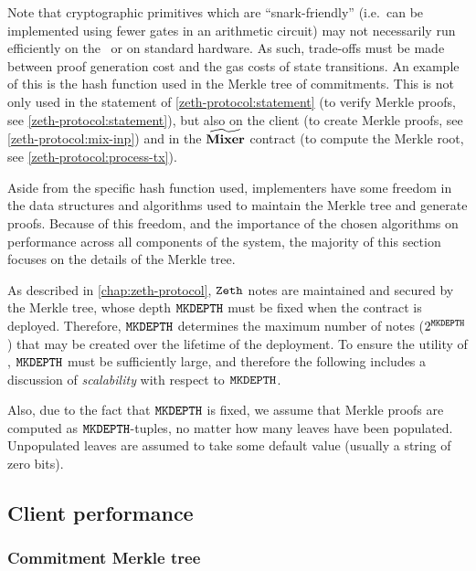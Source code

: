 Note that cryptographic primitives which are ``snark-friendly'' (i.e.~can be implemented using fewer gates in an arithmetic circuit) may not necessarily run efficiently on the \evm~or on standard hardware. As such, trade-offs must be made between proof generation cost and the gas costs of state transitions. An example of this is the hash function used in the Merkle tree of commitments. This is not only used in the statement of \cref{zeth-protocol:statement} (to verify Merkle proofs, see \cref{zeth-protocol:statement}), but also on the client (to create Merkle proofs, see \cref{zeth-protocol:mix-inp}) and in the $\widetilde{\mathbf{Mixer}}$ contract (to compute the Merkle root, see \cref{zeth-protocol:process-tx}).

Aside from the specific hash function used, implementers have some freedom in the data structures and algorithms used to maintain the Merkle tree and generate proofs. Because of this freedom, and the importance of the chosen algorithms on performance across all components of the system, the majority of this section focuses on the details of the Merkle tree.

As described in \cref{chap:zeth-protocol}, $\texttt{Zeth}{}$ notes are maintained and secured by the Merkle tree, whose depth $\mathtt{MKDEPTH}$ must be fixed when the contract is deployed. Therefore, $\mathtt{MKDEPTH}$ determines the maximum number of notes ($2^{\mathtt{MKDEPTH}}$) that may be created over the lifetime of the deployment. To ensure the utility of \zeth, $\mathtt{MKDEPTH}$ must be sufficiently large, and therefore the following includes a discussion of \emph{scalability} with respect to $\mathtt{MKDEPTH}$.

Also, due to the fact that $\mathtt{MKDEPTH}$ is fixed, we assume that Merkle proofs are computed as $\mathtt{MKDEPTH}$-tuples, no matter how many leaves have been populated. Unpopulated leaves are assumed to take some default value (usually a string of zero bits).

\subsection{Client performance}\label{implementation:efficiency:client-performance}


\subsubsection{Commitment Merkle tree}

